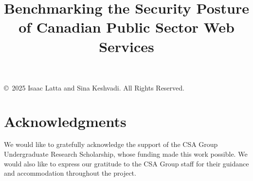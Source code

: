 \documentclass[pdflatex,sn-mathphys-num]{sn-jnl}
\numberwithin{equation}{section}
\theoremstyle{thmstyleone}
\theoremstyle{thmstyletwo}%
\theoremstyle{thmstylethree}%
\begin{document}
\title[Article Title]{Benchmarking the Security Posture of Canadian Public Sector Web Services}

\author[1]{ \footnotemark[1]}
\author[1]{ \footnotemark[3]}



\maketitle

\vfill
\begin{center}
\small
\copyright~2025 Isaac Latta and 
Sina Keshvadi. All Rights Reserved.
\end{center}
\clearpage

\section{Acknowledgments}
We would like to gratefully acknowledge the support of the CSA Group Undergraduate Research Scholarship, 
whose funding made this work possible. We would also like to express our gratitude 
to the CSA Group staff for their guidance and accommodation throughout the project.

\end{document}
